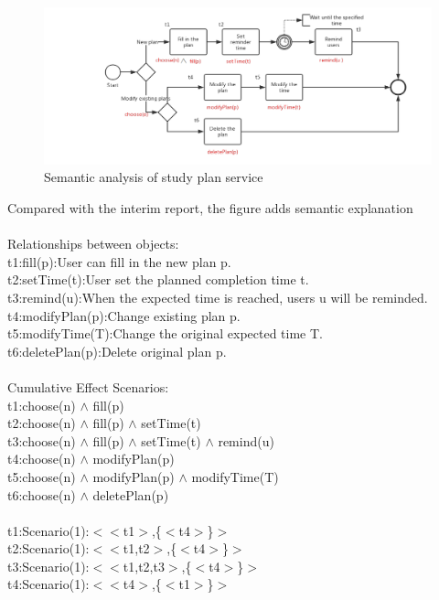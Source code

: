 \documentclass[runningheads]{llncs}
\begin{document}
\begin{figure}[H]
		\centering %
		\includegraphics[width=1.0\textwidth]{./figure/Hyy/study} %
		\caption{Semantic analysis of study plan service} %
		\label{study} %
	\end{figure}
Compared with the interim report, the figure adds semantic explanation\\
\\
Relationships between objects:\\
t1:fill(p):User can fill in the new plan p.\\
t2:setTime(t):User set the planned completion time t.\\
t3:remind(u):When the expected time is reached, users u will be reminded.\\
t4:modifyPlan(p):Change existing plan p.\\
t5:modifyTime(T):Change the original expected time T.\\
t6:deletePlan(p):Delete original plan p.\\
\\
Cumulative Effect Scenarios:\\
t1:choose(n) $\wedge$ fill(p)\\
t2:choose(n) $\wedge$ fill(p) $\wedge$ setTime(t)\\
t3:choose(n) $\wedge$ fill(p) $\wedge$ setTime(t) $\wedge$ remind(u)\\
t4:choose(n) $\wedge$ modifyPlan(p)\\
t5:choose(n) $\wedge$ modifyPlan(p) $\wedge$ modifyTime(T)\\
t6:choose(n) $\wedge$ deletePlan(p)\\
\\
t1:Scenario(1):$<$$<$t1$>$,\{$<$t4$>$\}$>$\\
t2:Scenario(1):$<$$<$t1,t2$>$,\{$<$t4$>$\}$>$\\
t3:Scenario(1):$<$$<$t1,t2,t3$>$,\{$<$t4$>$\}$>$\\
t4:Scenario(1):$<$$<$t4$>$,\{$<$t1$>$\}$>$\\
\end{document}
